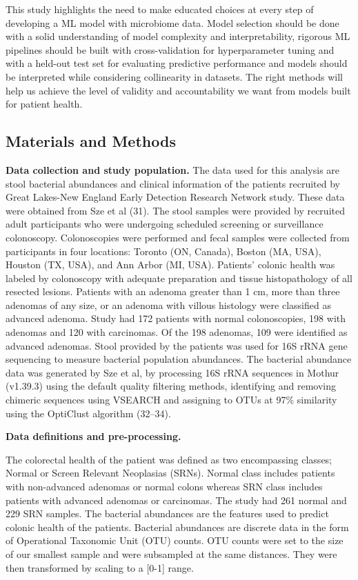 \documentclass[11pt,]{article}
\begin{document}
This study highlights the need to make educated choices at every step of
developing a ML model with microbiome data. Model selection should be
done with a solid understanding of model complexity and
interpretability, rigorous ML pipelines should be built with
cross-validation for hyperparameter tuning and with a held-out test set
for evaluating predictive performance and models should be interpreted
while considering collinearity in datasets. The right methods will help
us achieve the level of validity and accountability we want from models
built for patient health.

\subsection{Materials and Methods}\label{materials-and-methods}

\textbf{Data collection and study population.} The data used for this
analysis are stool bacterial abundances and clinical information of the
patients recruited by Great Lakes-New England Early Detection Research
Network study. These data were obtained from Sze et al (31). The stool
samples were provided by recruited adult participants who were
undergoing scheduled screening or surveillance colonoscopy.
Colonoscopies were performed and fecal samples were collected from
participants in four locations: Toronto (ON, Canada), Boston (MA, USA),
Houston (TX, USA), and Ann Arbor (MI, USA). Patients' colonic health was
labeled by colonoscopy with adequate preparation and tissue
histopathology of all resected lesions. Patients with an adenoma greater
than 1 cm, more than three adenomas of any size, or an adenoma with
villous histology were classified as advanced adenoma. Study had 172
patients with normal colonoscopies, 198 with adenomas and 120 with
carcinomas. Of the 198 adenomas, 109 were identified as advanced
adenomas. Stool provided by the patients was used for 16S rRNA gene
sequencing to measure bacterial population abundances. The bacterial
abundance data was generated by Sze et al, by processing 16S rRNA
sequences in Mothur (v1.39.3) using the default quality filtering
methods, identifying and removing chimeric sequences using VSEARCH and
assigning to OTUs at 97\% similarity using the OptiClust algorithm
(32--34).

\textbf{Data definitions and pre-processing.}

The colorectal health of the patient was defined as two encompassing
classes; Normal or Screen Relevant Neoplasias (SRNs). Normal class
includes patients with non-advanced adenomas or normal colons whereas
SRN class includes patients with advanced adenomas or carcinomas. The
study had 261 normal and 229 SRN samples. The bacterial abundances are
the features used to predict colonic health of the patients. Bacterial
abundances are discrete data in the form of Operational Taxonomic Unit
(OTU) counts. OTU counts were set to the size of our smallest sample and
were subsampled at the same distances. They were then transformed by
scaling to a {[}0-1{]} range.
\end{document}

